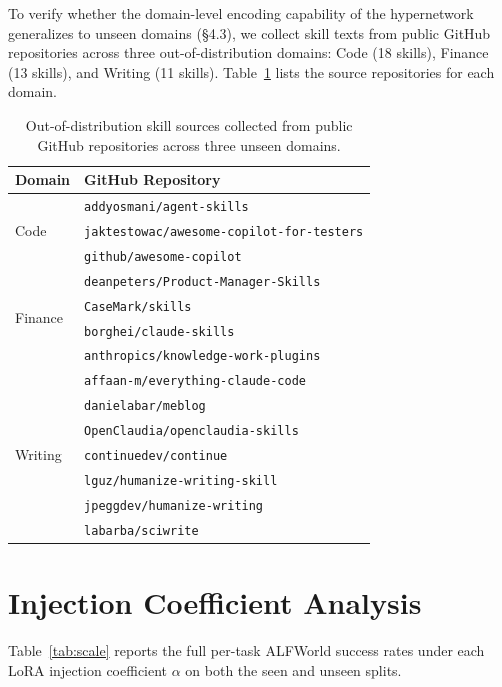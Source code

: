 \documentclass{llmxive}
\begin{document}
To verify whether the domain-level encoding capability of the hypernetwork generalizes to unseen domains (\S4.3), we collect skill texts from public GitHub repositories across three out-of-distribution domains: Code (18 skills), Finance (13 skills), and Writing (11 skills). Table~\ref{tab:ood_sources} lists the source repositories for each domain.

\begin{table}[!htbp]
\centering
\small
\begin{tabular}{ll}
\toprule
\textbf{Domain} & \textbf{GitHub Repository} \\
\midrule
\multirow{3}{*}{Code}
  & \texttt{addyosmani/agent-skills} \\
  & \texttt{jaktestowac/awesome-copilot-for-testers} \\
  & \texttt{github/awesome-copilot} \\
\midrule
\multirow{4}{*}{Finance}
  & \texttt{deanpeters/Product-Manager-Skills} \\
  & \texttt{CaseMark/skills} \\
  & \texttt{borghei/claude-skills} \\
  & \texttt{anthropics/knowledge-work-plugins} \\
\midrule
\multirow{7}{*}{Writing}
  & \texttt{affaan-m/everything-claude-code} \\
  & \texttt{danielabar/meblog} \\
  & \texttt{OpenClaudia/openclaudia-skills} \\
  & \texttt{continuedev/continue} \\
  & \texttt{lguz/humanize-writing-skill} \\
  & \texttt{jpeggdev/humanize-writing} \\
  & \texttt{labarba/sciwrite} \\
\bottomrule
\end{tabular}
\label{tab:ood_sources}
\caption{Out-of-distribution skill sources collected from public GitHub repositories across three unseen domains.}
\end{table}
\section{Injection Coefficient Analysis}
\label{app:scale}

Table~\ref{tab:scale} reports the full per-task ALFWorld success rates under each LoRA injection coefficient $\alpha$ on both the seen and unseen splits.
\end{document}
